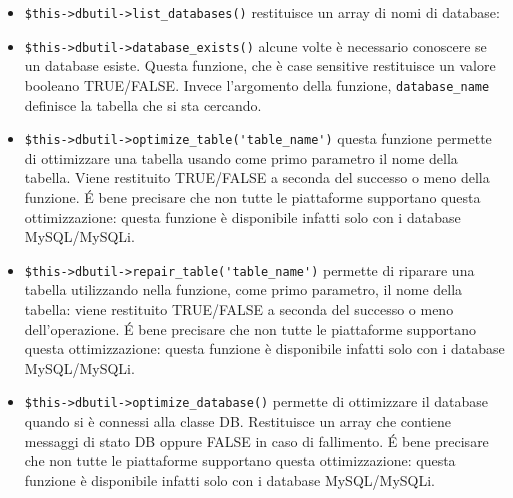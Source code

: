 \begin{itemize}
\item \verb|$this->dbutil->list_databases()| restituisce un array di nomi di database:


\item \verb|$this->dbutil->database_exists()| alcune volte è necessario conoscere se un database esiste. Questa funzione, che è case sensitive restituisce un valore booleano TRUE/FALSE. Invece l'argomento della funzione, \verb|database_name| definisce la tabella che si sta cercando.


\item \verb|$this->dbutil->optimize_table('table_name')| questa funzione permette di ottimizzare una tabella usando come primo parametro il nome della tabella. Viene restituito TRUE/FALSE a seconda del successo o meno della funzione. \'E bene precisare che non tutte le piattaforme supportano questa ottimizzazione: questa funzione è disponibile infatti solo con i database MySQL/MySQLi.


\item \verb|$this->dbutil->repair_table('table_name')| permette di riparare una tabella utilizzando nella funzione, come primo parametro, il nome della tabella: viene restituito TRUE/FALSE a seconda del successo o meno dell'operazione. \'E bene precisare che non tutte le piattaforme supportano questa ottimizzazione: questa funzione è disponibile infatti solo con i database MySQL/MySQLi.


\item \verb|$this->dbutil->optimize_database()| permette di ottimizzare il database quando si è connessi alla classe DB. Restituisce un array che contiene messaggi di stato DB oppure FALSE in caso di fallimento. \'E bene precisare che non tutte le piattaforme supportano questa ottimizzazione: questa funzione è disponibile infatti solo con i database MySQL/MySQLi.


\end{itemize}
